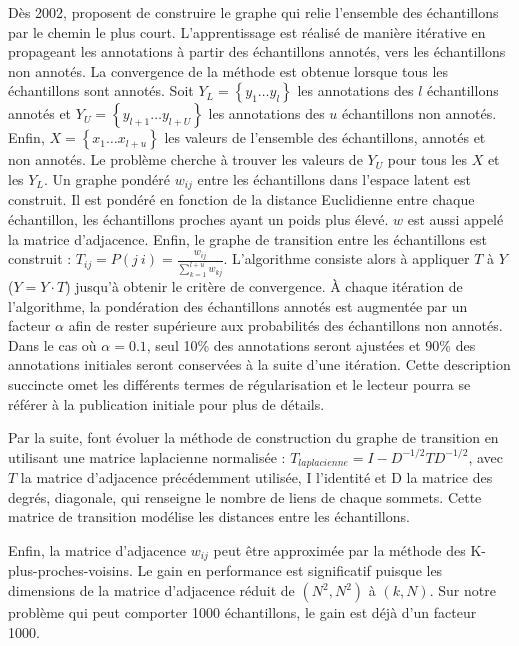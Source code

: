 Dès 2002, \citeauthor{zhu_learning_2002} \cite{zhu_learning_2002} proposent de construire le graphe qui relie l'ensemble des échantillons par le chemin le plus court.
L'apprentissage est réalisé de manière itérative en propageant les annotations à partir des échantillons annotés, vers les échantillons non annotés.
La convergence de la méthode est obtenue lorsque tous les échantillons sont annotés.
Soit $Y_{L}=\left\{y_{1} \ldots y_{l}\right\}$ les annotations des $l$ échantillons annotés et $Y_{U}=\left\{y_{l+1} \ldots y_{l+U}\right\}$ les annotations des $u$ échantillons non annotés.
Enfin, $X=\left\{x_{1} \ldots x_{l+u}\right\}$ les valeurs de l'ensemble des échantillons, annotés et non annotés.
Le problème cherche à trouver les valeurs de $Y_{U}$ pour tous les $X$ et les $Y_{L}$.
Un graphe pondéré $w_{ij}$ entre les échantillons dans l'espace latent est construit. Il est pondéré en fonction de la distance Euclidienne entre chaque échantillon, les échantillons proches ayant un poids plus élevé.
$w$ est aussi appelé la matrice d'adjacence.
Enfin, le graphe de transition entre les échantillons est construit : $T_{i j}=P(j \ i)=\frac{w_{i j}}{\sum_{k=1}^{l+u} w_{k j}}$.
L'algorithme consiste alors à appliquer $T$ à $Y$ ($Y = Y \cdot T$) jusqu'à obtenir le critère de convergence.
À chaque itération de l'algorithme, la pondération des échantillons annotés est augmentée par un facteur $\alpha$ afin de rester supérieure aux probabilités des échantillons non annotés.
Dans le cas où $\alpha = 0.1$, seul 10\% des annotations seront ajustées et 90\% des annotations initiales seront conservées à la suite d'une itération.
Cette description succincte omet les différents termes de régularisation et le lecteur pourra se référer à la publication initiale pour plus de détails.

Par la suite, \citeauthor{zhou_learning_2003} \cite{zhou_learning_2003} font évoluer la méthode de construction du graphe de transition en utilisant une matrice laplacienne normalisée : $T_{laplacienne} = I - D^{-1/2} T D^{-1/2}$, avec $T$ la matrice d'adjacence précédemment utilisée, I l'identité et D la matrice des degrés, diagonale, qui renseigne le nombre de liens de chaque sommets.
Cette matrice de transition modélise les distances entre les échantillons.

Enfin, la matrice d'adjacence $w_{ij}$ peut être approximée par la méthode des K-plus-proches-voisins.
Le gain en performance est significatif puisque les dimensions de la matrice d'adjacence réduit de $(N^2, N^2)$ à $(k, N)$.
Sur notre problème qui peut comporter 1000 échantillons, le gain est déjà d'un facteur 1000.

